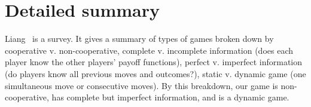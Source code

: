\documentclass{sig-alternate}
\begin{document}
\date{16 October 2015}

\maketitle




\section{Detailed summary}

Liang~\cite{liang2013game} is a survey.  It gives a summary of types
of games broken down by cooperative v. non-cooperative, complete
v. incomplete information (does each player know the other players'
payoff functions), perfect v. imperfect information (do players know
all previous moves and outcomes?), static v. dynamic game (one
simultaneous move or consecutive moves). By this breakdown, our game
is non-cooperative, has complete but imperfect information, and is a
dynamic game. 
\end{document}
